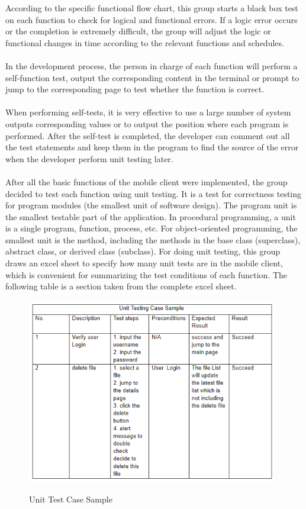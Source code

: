 \documentclass[11pt]{article}
\begin{document}
According to the specific functional flow chart, this group starts a black box test on each function to check for logical and functional errors. If a logic error occurs or the completion is extremely difficult, the group will adjust the logic or functional changes in time according to the relevant functions and schedules.
\\
\\
In the development process, the person in charge of each function will perform a self-function test, output the corresponding content in the terminal or prompt to jump to the corresponding page to test whether the function is correct. 
\\
\\
When performing self-tests, it is very effective to use a large number of system outputs corresponding values or to output the position where each program is performed. After the self-test is completed, the developer can comment out all the test statements and keep them in the program to find the source of the error when the developer perform unit testing later.
\\
\\
After all the basic functions of the mobile client were implemented, the group decided to test each function using unit testing. It is a test for correctness testing for program modules (the smallest unit of software design). The program unit is the smallest testable part of the application. In procedural programming, a unit is a single program, function, process, etc. For object-oriented programming, the smallest unit is the method, including the methods in the base class (superclass), abstract class, or derived class (subclass). For doing unit testing, this group draws an excel sheet to specify how many unit tests are in the mobile client, which is convenient for summarizing the test conditions of each function. The following table is a section taken from the complete excel sheet.

\begin{figure}[htbp]
	\centering
	\includegraphics[width=11cm]{9.png}\\
	\caption{Unit Test Case Sample}
\end{figure}
\end{document}
